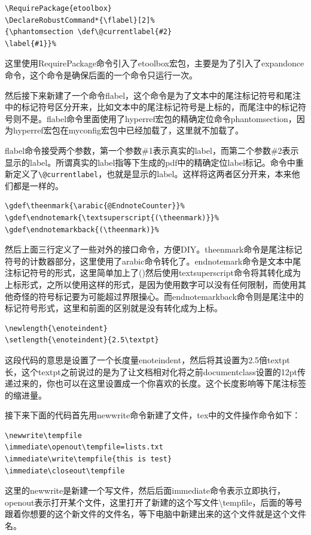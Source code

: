 \documentclass[11pt,oneside]{book}
\begin{document}
\begin{Verbatim}
\RequirePackage{etoolbox}
\DeclareRobustCommand*{\flabel}[2]%
{\phantomsection \def\@currentlabel{#2}
\label{#1}}%
\end{Verbatim}

这里使用RequirePackage命令引入了etoolbox宏包，主要是为了引入了expandonce命令，这个命令是确保后面的一个命令只运行一次。

然后接下来新建了一个命令flabel，这个命令是为了文本中的尾注标记符号和尾注中的标记符号区分开来，比如文本中的尾注标记符号是上标的，而尾注中的标记符号则不是。flabel命令里面使用了hyperref宏包的精确定位命令phantomsection，因为hyperref宏包在myconfig宏包中已经加载了，这里就不加载了。

flabel命令接受两个参数，第一个参数\#{}1表示真实的label，而第二个参数\#{}2表示显示的label。所谓真实的label指等下生成的pdf中的精确定位label标记。命令中重新定义了\verb+\@currentlabel+，也就是显示的label。这样将这两者区分开来，本来他们都是一样的。



\begin{Verbatim}
\gdef\theenmark{\arabic{@EndnoteCounter}}%
\gdef\endnotemark{\textsuperscript{(\theenmark)}}%
\gdef\endnotemarkback{(\theenmark)}%
\end{Verbatim}
然后上面三行定义了一些对外的接口命令，方便DIY。theenmark命令是尾注标记符号的计数器部分，这里使用了arabic命令转化了。endnotemark命令是文本中尾注标记符号的形式，这里简单加上了()然后使用textsuperscript命令将其转化成为上标形式，之所以使用这样的形式，是因为使用数字可以没有任何限制，而使用其他奇怪的符号标记要为可能超过界限操心。而endnotemarkback命令则是尾注中的标记符号形式，这里和前面的区别就是没有转化成为上标。

\begin{Verbatim}
\newlength{\enoteindent}
\setlength{\enoteindent}{2.5\textpt}
\end{Verbatim}
这段代码的意思是设置了一个长度量enoteindent，然后将其设置为2.5倍textpt长，这个textpt之前说过的是为了让文档相对化将之前documentclass设置的12pt传递过来的，你也可以在这里设置成一个你喜欢的长度。这个长度影响等下尾注标签的缩进量。


接下来下面的代码首先用newwrite命令新建了文件，tex中的文件操作命令如下：
\begin{Verbatim}
\newwrite\tempfile
\immediate\openout\tempfile=lists.txt
\immediate\write\tempfile{this is test}
\immediate\closeout\tempfile
\end{Verbatim}
这里的newwrite是新建一个写文件，然后后面immediate命令表示立即执行，openout表示打开某个文件，这里打开了新建的这个写文件\textbackslash tempfile，后面的等号跟着你想要的这个新文件的文件名，等下电脑中新建出来的这个文件就是这个文件名。
\end{document}
